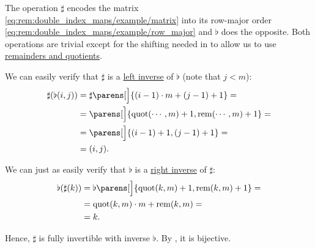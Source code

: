 \begin{remark}
  The operation \( \sharp \) encodes the matrix \eqref{eq:rem:double_index_maps/example/matrix} into its row-major order \eqref{eq:rem:double_index_maps/example/row_major} and \( \flat \) does the opposite. Both operations are trivial except for the shifting needed in to allow us to use \hyperref[def:euclidean_domain]{remainders and quotients}.

  We can easily verify that \( \sharp \) is a \hyperref[def:morphism_invertibility/left_invertible]{left inverse} of \( \flat \) (note that \( j < m \)):
  \begin{align*}
    \sharp(\flat(i, j))
    &=
    \sharp\parens[\Big]{ (i - 1) \cdot m + (j - 1) + 1 }
    = \\ &=
    \parens[\Big]{ \quot(\cdots, m) + 1, \rem(\cdots, m) + 1 }
    = \\ &=
    \parens[\Big]{ (i - 1) + 1, (j - 1) + 1 }
    = \\ &=
    (i, j).
  \end{align*}

  We can just as easily verify that \( \flat \) is a \hyperref[def:morphism_invertibility/right_invertible]{right inverse} of \( \sharp \):
  \begin{align*}
    \flat(\sharp(k))
    &=
    \flat\parens[\Big]{ \quot(k, m) + 1, \rem(k, m) + 1 }
    = \\ &=
    \quot(k, m) \cdot m + \rem(k, m)
    = \\ &=
    k.
  \end{align*}

  Hence, \( \sharp \) is fully invertible with inverse \( \flat \). By , it is bijective.
\end{remark}
